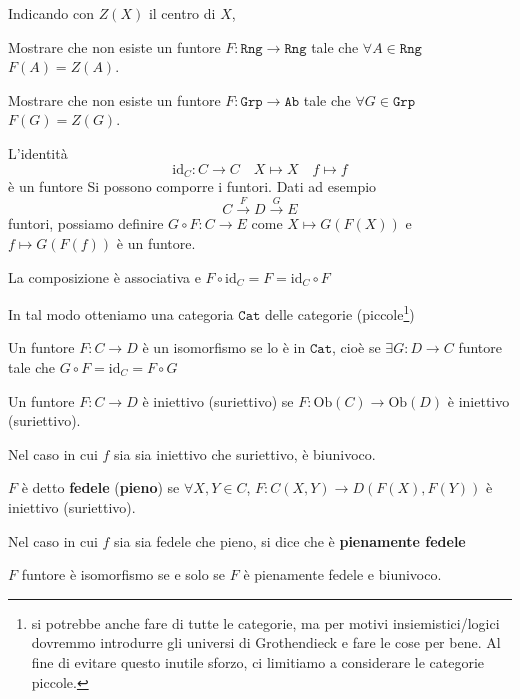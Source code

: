 \begin{eser}{}
    Indicando con \(Z{(X)}\) il centro di \(X\),

   Mostrare che non esiste un funtore \(F : \mathtt{Rng} \to \mathtt{Rng}\) tale
    che \(\forall A \in \mathtt{Rng}\) \(F{(A)} = Z{(A)}\).

    Mostrare che non esiste un funtore \(F : \mathtt{Grp} \to \mathtt{Ab}\) tale
    che \(\forall G \in \mathtt{Grp}\) \(F{(G)} = Z{(G)}\).
\end{eser}

    L'identità
    \[
      \mathrm{id}_C : C \to C \quad X \mapsto X \quad f \mapsto f
    \]
    è un funtore
    Si possono comporre i funtori. Dati ad esempio 
    \[
      C \overset{F}{\to } D \overset{G}{\to } E
    \]
    funtori, possiamo definire \(G \circ F : C \to E\) come \(X \mapsto G{(F{(X)})}\)  e \(f \mapsto G{(F{(f)})}\) è un funtore.

    La composizione è associativa  e \(F \circ \mathrm{id}_C = F = \mathrm{id}_C \circ F\) 

In tal modo otteniamo una categoria \(\mathtt{Cat}\) delle categorie (piccole\footnote{si potrebbe anche fare di tutte le categorie, ma per motivi
insiemistici/logici dovremmo introdurre gli universi di Grothendieck e fare le
cose per bene. Al fine di evitare questo inutile sforzo, ci limitiamo a
considerare le categorie piccole.})

\begin{definition}{}
    Un funtore \(F : C \to D\) è un isomorfismo se lo è in \(\mathtt{Cat}\),
    cioè se \(\exists G : D \to C\)  funtore tale che \(G \circ F = \mathrm{id}_C = F \circ G\) 
\end{definition}

\begin{definition}{}
    Un funtore \(F : C \to D\) è iniettivo (suriettivo) se \(F : \mathrm{Ob}{(C)} \to \mathrm{Ob}{(D)}\) è iniettivo (suriettivo).

    Nel caso in cui \(f\) sia sia iniettivo che suriettivo, è biunivoco.
\end{definition}

\begin{definition}{}
    \(F\) è detto \textbf{fedele} (\textbf{pieno}) se \(\forall X, Y \in C\), \(F : C{(X, Y)} \to D{(F{(X)}, F{(Y)})}\) è iniettivo (suriettivo).

    Nel caso in cui \(f\) sia sia fedele che pieno, si dice che è
    \textbf{pienamente fedele}
\end{definition}
\begin{eser}{}
    \(F\) funtore è isomorfismo se e solo se \(F\) è pienamente fedele e
    biunivoco.
\end{eser}


